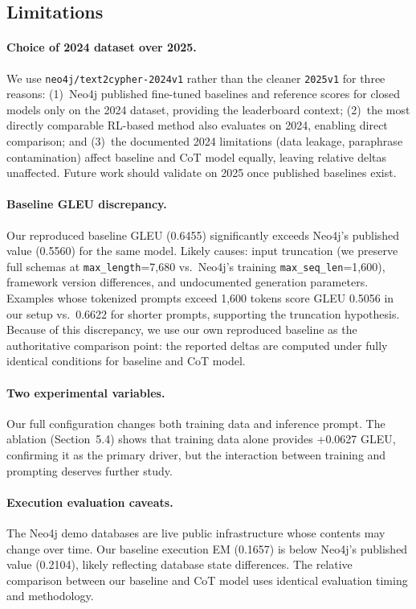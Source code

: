 \documentclass[11pt]{article}
\begin{document}
\subsection{Limitations}

\paragraph{Choice of 2024 dataset over 2025.} We use \texttt{neo4j/text2cypher-2024v1} rather than the cleaner \texttt{2025v1} for three reasons: (1)~Neo4j published fine-tuned baselines and reference scores for closed models only on the 2024 dataset, providing the leaderboard context; (2)~the most directly comparable RL-based method \citep{tran2025refining} also evaluates on 2024, enabling direct comparison; and (3)~the documented 2024 limitations (data leakage, paraphrase contamination) affect baseline and CoT model equally, leaving relative deltas unaffected. Future work should validate on 2025 once published baselines exist.

\paragraph{Baseline GLEU discrepancy.} Our reproduced baseline GLEU (0.6455) significantly exceeds Neo4j's published value (0.5560) for the same model. Likely causes: input truncation (we preserve full schemas at \texttt{max\_length}=7,680 vs.\ Neo4j's training \texttt{max\_seq\_len}=1,600), framework version differences, and undocumented generation parameters. Examples whose tokenized prompts exceed 1,600 tokens score GLEU 0.5056 in our setup vs.\ 0.6622 for shorter prompts, supporting the truncation hypothesis. Because of this discrepancy, we use our own reproduced baseline as the authoritative comparison point: the reported deltas are computed under fully identical conditions for baseline and CoT model.

\paragraph{Two experimental variables.} Our full configuration changes both training data and inference prompt. The ablation (Section~5.4) shows that training data alone provides +0.0627 GLEU, confirming it as the primary driver, but the interaction between training and prompting deserves further study.

\paragraph{Execution evaluation caveats.} The Neo4j demo databases are live public infrastructure whose contents may change over time. Our baseline execution EM (0.1657) is below Neo4j's published value (0.2104), likely reflecting database state differences. The relative comparison between our baseline and CoT model uses identical evaluation timing and methodology.
\end{document}
